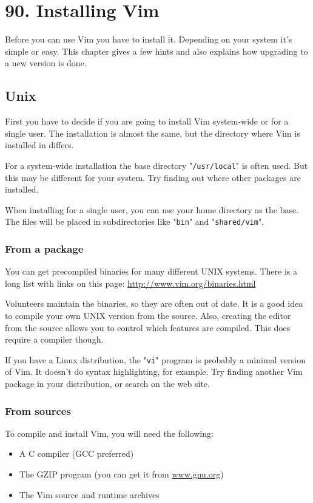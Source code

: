 \section{90. Installing Vim}
\label{Installing Vim}
\label{install}
Before you can use Vim you have to install it.
Depending on your system it's simple or easy.
This chapter gives a few hints and also explains how upgrading to a new version is done.
\subsection{Unix}
First you have to decide if you are going to install Vim system-wide or for a single user.
The installation is almost the same, but the directory where Vim is installed in differs.

For a system-wide installation the base directory "\texttt{/usr/local}" is often used.
But this may be different for your system.
Try finding out where other packages are installed.

When installing for a single user, you can use your home directory as the base.
The files will be placed in subdirectories like "\texttt{bin}" and "\texttt{shared/vim}".

\subsubsection{From a package}
You can get precompiled binaries for many different UNIX systems.
There is a long list with links on this page: \url{http://www.vim.org/binaries.html}

Volunteers maintain the binaries, so they are often out of date.
It is a good idea to compile your own UNIX version from the source.
Also, creating the editor from the source allows you to control which features are compiled.
This does require a compiler though.

If you have a Linux distribution, the "\texttt{vi}" program is probably a minimal version of Vim.
It doesn't do syntax highlighting, for example.
Try finding another Vim package in your distribution, or search on the web site.

\subsubsection{From sources}
To compile and install Vim, you will need the following:

\begin{itemize}
    \item A C compiler (GCC preferred)
    \item The GZIP program (you can get it from \url{www.gnu.org})
    \item The Vim source and runtime archives
\end{itemize}


